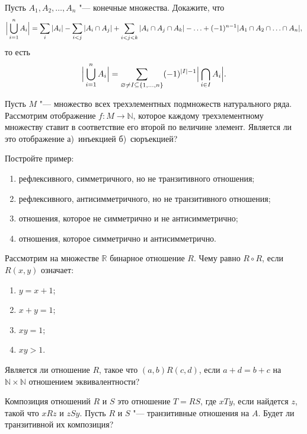

\def\SheetNo{2}


\begin{problems}


\item Пусть $A_1,A_2,\ldots,A_n$ "--- конечные множества. Докажите, что
\[
\Bigl|\,\bigcup_{i=1}^{n}A_i\Bigr|
=\sum_{i}|A_i|-\sum_{i<j}|A_i\cap A_j|+\sum_{i<j<k}|A_i\cap A_j\cap A_k|-\ldots+(-1)^{n-1}|A_1\cap A_2\cap\ldots\cap A_n|,
\]
то есть
\[
\Bigl|\,\bigcup_{i=1}^{n}A_i\Bigr|
=\sum_{\varnothing\neq I\subseteq\{1,\ldots,n\}}(-1)^{|I|-1}\Bigl|\,\bigcap_{i\in I}A_i\Bigr|.
\]

\item 
Пусть $M$ "--- множество всех трехэлементных подмножеств натурального ряда. Рассмотрим отображение $f\colon M \to \mathbb{N}$, которое каждому трехэлементному множеству ставит в соответствие его второй по величине элемент. Является ли это отображение а)~инъекцией б)~сюръекцией?

\item Постройте пример:
\begin{enumerate}[label=\alph*)]
  \item рефлексивного, симметричного, но не транзитивного отношения;
  \item рефлексивного, антисимметричного, но не транзитивного отношения;
  \item отношения, которое не симметрично и не антисимметрично;
  \item отношения, которое симметрично и антисимметрично.
\end{enumerate}

\item Рассмотрим на множестве $\mathbb{R}$ бинарное отношение $R$. Чему равно $R\circ R$, если $R(x,y)$ означает:
\begin{enumerate}[label=\alph*)]
  \item $y=x+1$;
  \item $x+y=1$;
  \item $xy=1$;
  \item $xy>1$.
\end{enumerate}

\item Является ли отношение $R$, такое что $(a,b)R(c,d)$, если $a+d=b+c$ на $\mathbb{N}\times\mathbb{N}$ отношением эквивалентности?

\item Композиция отношений $R$ и $S$ это отношение $T=RS$, где $xTy$, если найдется $z$, такой что $xRz$ и $zSy$. Пусть $R$ и $S$ "--- транзитивные отношения на $A$. Будет ли транзитивной их композиция?


\end{problems}
